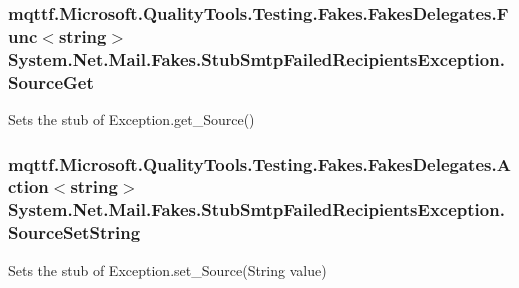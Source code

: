 \hypertarget{class_system_1_1_net_1_1_mail_1_1_fakes_1_1_stub_smtp_failed_recipients_exception_ae1ef7ffa793a42c6141e7f272a3ac21e}{
\subsubsection[{Source\-Get}]{\setlength{\rightskip}{0pt plus 5cm}mqttf.\-Microsoft.\-Quality\-Tools.\-Testing.\-Fakes.\-Fakes\-Delegates.\-Func$<$string$>$ System.\-Net.\-Mail.\-Fakes.\-Stub\-Smtp\-Failed\-Recipients\-Exception.\-Source\-Get}}\label{class_system_1_1_net_1_1_mail_1_1_fakes_1_1_stub_smtp_failed_recipients_exception_ae1ef7ffa793a42c6141e7f272a3ac21e}


Sets the stub of Exception.\-get\-\_\-\-Source()

\hypertarget{class_system_1_1_net_1_1_mail_1_1_fakes_1_1_stub_smtp_failed_recipients_exception_a96737b4340b8145e81a748b579e74d2f}{
\subsubsection[{Source\-Set\-String}]{\setlength{\rightskip}{0pt plus 5cm}mqttf.\-Microsoft.\-Quality\-Tools.\-Testing.\-Fakes.\-Fakes\-Delegates.\-Action$<$string$>$ System.\-Net.\-Mail.\-Fakes.\-Stub\-Smtp\-Failed\-Recipients\-Exception.\-Source\-Set\-String}}\label{class_system_1_1_net_1_1_mail_1_1_fakes_1_1_stub_smtp_failed_recipients_exception_a96737b4340b8145e81a748b579e74d2f}


Sets the stub of Exception.\-set\-\_\-\-Source(\-String value)

